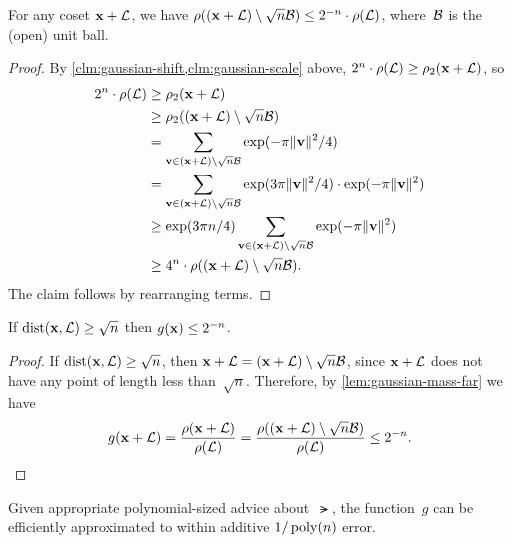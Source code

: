 \documentclass[11pt]{article}
\begin{document}
\begin{lemma}
  \label{lem:gaussian-mass-far}
  For any coset $\mathbf{x} + \mathcal{L}$, we have
  $\rho((\mathbf{x} + \mathcal{L}) \setminus \sqrt{n}\mathcal{B}) \leq 2^{-n} \cdot
  \rho(\mathcal{L})$, where~$\mathcal{B}$ is the (open) unit ball.
\end{lemma}

\begin{proof}
  By \cref{clm:gaussian-shift,clm:gaussian-scale} above,
  $2^n \cdot \rho(\mathcal{L}) \geq \rho_2(\mathbf{x} + \mathcal{L})$, so
  \begin{align*}
    2^n \cdot \rho(\mathcal{L})
    &\geq \rho_2(\mathbf{x} + \mathcal{L}) \\
    &\geq \rho_2((\mathbf{x} + \mathcal{L})\setminus \sqrt{n}\mathcal{B}) \\
    &= \sum_{\mathbf{v} \in (\mathbf{x} + \mathcal{L}) \setminus \sqrt{n}\mathcal{B}} \exp(-\pi \lVert\mathbf{v}\rVert^2/4) \\
    &= \sum_{\mathbf{v} \in (\mathbf{x} + \mathcal{L}) \setminus \sqrt{n}\mathcal{B}}
      \exp(3\pi \lVert\mathbf{v}\rVert^2/4) \cdot \exp(-\pi \lVert\mathbf{v}\rVert^2) \\
    &\geq \exp(3\pi n/4) \sum_{\mathbf{v} \in (\mathbf{x} + \mathcal{L}) \setminus
      \sqrt{n}\mathcal{B}}\exp(-\pi \lVert\mathbf{v}\rVert^2) \\
    &\geq  4^n \cdot \rho((\mathbf{x} + \mathcal{L})\setminus \sqrt{n}\mathcal{B}).
  \end{align*}
  The claim follows by rearranging terms.
\end{proof}

\begin{corollary}
  If $\operatorname{dist}(\mathbf{x},\mathcal{L}) \geq \sqrt{n}$ then $g(\mathbf{x}) \leq 2^{-n}$.
\end{corollary}

\begin{proof}
  If $\operatorname{dist}(\mathbf{x},\mathcal{L}) \geq \sqrt{n}$, then
  $\mathbf{x} + \mathcal{L} = (\mathbf{x} + \mathcal{L}) \setminus \sqrt{n}\mathcal{B}$, since
  $\mathbf{x} + \mathcal{L}$ does not have any point of length less
  than~$\sqrt{n}$. Therefore, by \cref{lem:gaussian-mass-far} we have
  \[ g(\mathbf{x} + \mathcal{L}) = \frac{\rho(\mathbf{x} + \mathcal{L})}{\rho(\mathcal{L})} =
    \frac{\rho((\mathbf{x} + \mathcal{L})\setminus \sqrt{n}\mathcal{B})}{\rho(\mathcal{L})}
    \leq 2^{-n} . \]
\end{proof}

\begin{lemma}
  Given appropriate polynomial-sized advice about~$\lat$, the
  function~$g$ can be efficiently approximated to within additive
  $1/\operatorname{poly}(n)$ error.
\end{lemma}
\end{document}
